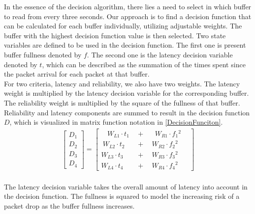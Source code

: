 \documentclass[journal,twoside]{IEEEtran}
\begin{document}
\indent In the essence of the decision algorithm, there lies a need to select in which buffer to read from every three seconds. Our approach is to find a decision function that can be calculated for each buffer individually, utilizing adjustable weights. The buffer with the highest decision function value is then selected. Two state variables are defined to be used in the decision function. The first one is present buffer fullness denoted by $f$. The second one is the latency decision variable denoted by $t$, which can be described as the summation of the times spent since the packet arrival for each packet at that buffer.\\

\indent For two criteria, latency and reliability, we also have two weights. The latency weight is multiplied by the latency decision variable for the corresponding buffer. The reliability weight is multiplied by the square of the fullness of that buffer. Reliability and latency components are summed to result in the decision function $D$, which is visualized in matrix function notation in \ref{DecisionFunciton}.\\
\begin{equation}
\begin{array}{l}
\begin{bmatrix}
D_{1}\\
D_{2}\\
D_{3}\\
D_{4}
\end{bmatrix} =\begin{bmatrix}
\ \ \ \ W_{L1} \cdotp t_{1} \ \  & + & \ \ \ \ W_{R1} \cdotp f{_{1}}^{2} \ \ \ \ \\
\ W_{L2} \cdotp t_{2} & + & \ \ W_{R2} \cdotp f{_{2}}^{2} \ \ \\
W_{L3} \cdotp t_{3} & + & \ \ W_{R3} \cdotp f{_{3}}^{2} \ \ \\
W_{L4} \cdotp t_{4} & + & \ \ W_{R4} \cdotp f{_{4}}^{2} \ \ 
\end{bmatrix}
\end{array}
\label{DecisionFunciton}
\end{equation}\\
The  latency decision variable takes the overall amount of latency into account in the decision function. The fullness is squared to model the increasing risk of a packet drop as the buffer fullness increases.
\end{document}
